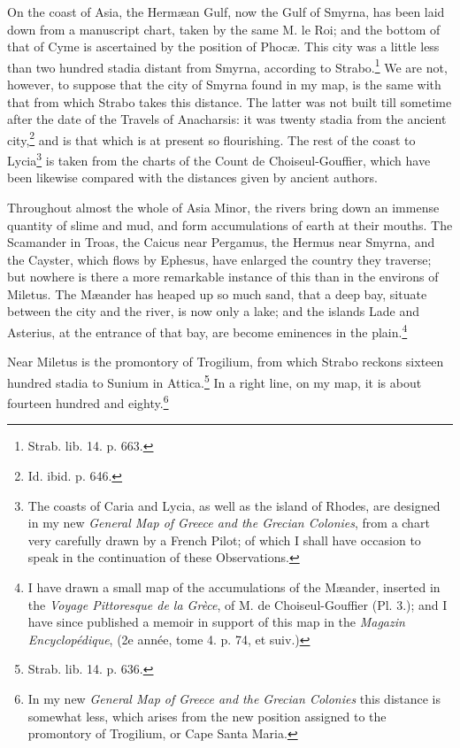 \documentclass[a4paper, 11pt, oneside, polutonikogreek, english]{article}
\begin{document}
On the coast of Asia, the Hermæan Gulf, now the Gulf of Smyrna, has been laid down from a manuscript chart, taken by the same M. le Roi; and the bottom of that of Cyme is ascertained by the position of Phocæ. This city was a little less than two hundred stadia distant from Smyrna, according to Strabo.\footnote{Strab. lib. 14. p. 663.} We are not, however, to suppose that the city of Smyrna found in my map, is the same with that from which Strabo takes this distance. The latter was not built till sometime after the date of the Travels of Anacharsis: it was twenty stadia from the ancient city,\footnote{Id. ibid. p. 646.} and is that which is at present so flourishing. The rest of the coast to Lycia\footnote{The coasts of Caria and Lycia, as well as the island of Rhodes, are designed in my new \emph{General Map of Greece and the Grecian Colonies}, from a chart very carefully drawn by a French Pilot; of which I shall have occasion to speak in the continuation of these Observations.} is taken from the charts of the Count de Choiseul-Gouffier, which have been likewise compared with the distances given by ancient authors.

Throughout almost the whole of Asia Minor, the rivers bring down an immense quantity of slime and mud, and form accumulations of earth at their mouths. The Scamander in Troas, the Caicus near Pergamus, the Hermus near Smyrna, and the Cayster, which flows by Ephesus, have enlarged the country they traverse; but nowhere is there a more remarkable instance of this than in the environs of Miletus. The Mæander has heaped up so much sand, that a deep bay, situate between the city and the river, is now only a lake; and the islands Lade and Asterius, at the entrance of that bay, are become eminences in the plain.\footnote{I have drawn a small map of the accumulations of the Mæander, inserted in the \emph{Voyage Pittoresque de la Grèce}, of M. de Choiseul-Gouffier (Pl. 3.); and I have since published a memoir in support of this map in the \emph{Magazin Encyclopédique}, (2e année, tome 4. p. 74, et suiv.)}

Near Miletus is the promontory of Trogilium, from which Strabo reckons sixteen hundred stadia to Sunium in Attica.\footnote{Strab. lib. 14. p. 636.} In a right line, on my map, it is about fourteen hundred and eighty.\footnote{In my new \emph{General Map of Greece and the Grecian Colonies} this distance is somewhat less, which arises from the new position assigned to the promontory of Trogilium, or Cape Santa Maria.}
\end{document}

